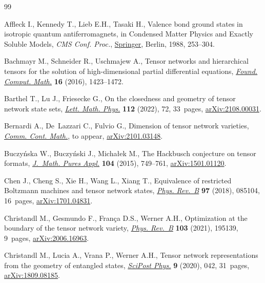 \begin{thebibliography}{99}
\footnotesize\itemsep=0pt

Affleck I., Kennedy T., Lieb E.H., Tasaki H., Valence bond ground states in
  isotropic quantum antiferromagnets, in Condensed Matter Physics and Exactly
  Soluble Models, \textit{CMS Conf. Proc.}, \href{https://doi.org/10.1007/978-3-662-06390-3_19}{Springer}, Berlin, 1988, 253--304.

Bachmayr M., Schneider R., Uschmajew A., Tensor networks and hierarchical
  tensors for the solution of high-dimensional partial differential equations,
  \href{https://doi.org/10.1007/s10208-016-9317-9}{\textit{Found. Comput. Math.}} \textbf{16} (2016), 1423--1472.

Barthel T., Lu J., Friesecke G., On the closedness and geometry of tensor
  network state sets, \href{https://doi.org/10.1007/s11005-022-01552-z}{\textit{Lett. Math. Phys.}} \textbf{112} (2022), 72,
  33~pages, \href{https://arxiv.org/abs/2108.00031}{arXiv:2108.00031}.

Bernardi A., De~Lazzari C., Fulvio G., Dimension of tensor network varieties,
  \href{https://doi.org/10.1142/S0219199722500596}{\textit{Comm. Cont. Math.}}, {t}o appear, \href{https://arxiv.org/abs/2101.03148}{arXiv:2101.03148}.

Buczy\'nska W., Buczy\'nski J., Micha{\l}ek M., The {H}ackbusch conjecture on
  tensor formats, \href{https://doi.org/10.1016/j.matpur.2015.05.002}{\textit{J.~Math. Pures Appl.}} \textbf{104} (2015), 749--761,
  \href{https://arxiv.org/abs/1501.01120}{arXiv:1501.01120}.

Chen J., Cheng S., Xie H., Wang L., Xiang T., Equivalence of restricted
  Boltzmann machines and tensor network states, \href{https://doi.org/10.1103/PhysRevB.97.085104}{\textit{Phys. Rev.~B}}
  \textbf{97} (2018), 085104, 16~pages, \href{https://arxiv.org/abs/1701.04831}{arXiv:1701.04831}.

Christandl M., Gesmundo F., Fran{\c{c}}a D.S., Werner A.H., Optimization at the
  boundary of the tensor network variety, \href{https://doi.org/10.1103/PhysRevB.103.195139}{\textit{Phys. Rev.~B}} \textbf{103}
  (2021), 195139, 9~pages, \href{https://arxiv.org/abs/2006.16963}{arXiv:2006.16963}.

Christandl M., Lucia A., Vrana P., Werner A.H., Tensor network representations
  from the geometry of entangled states, \href{https://doi.org/10.21468/scipostphys.9.3.042}{\textit{SciPost Phys.}} \textbf{9}
  (2020), 042, 31~pages, \href{https://arxiv.org/abs/1809.08185}{arXiv:1809.08185}.


\end{thebibliography}
